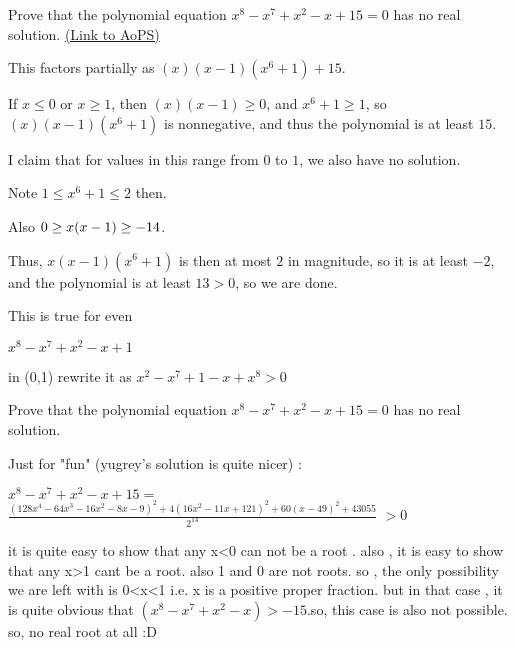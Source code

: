 \begin{problem}
	Prove that the polynomial equation $x^{8}-x^{7}+x^{2}-x+15=0$ has no real solution.
	\flushright \href{https://artofproblemsolving.com/community/c6h479486}{(Link to AoPS)}
\end{problem}



\begin{solution}
	This factors partially as $(x)(x-1)(x^6+1)+15$.

If $x\le 0$ or $x\ge 1$, then $(x)(x-1)\ge 0$, and $x^6+1\ge 1$, so $(x)(x-1)(x^6+1)$ is nonnegative, and thus the polynomial is at least $15$.

I claim that for values in this range from $0$ to $1$, we also have no solution.

Note $1\le x^6+1\le 2$ then.

Also $0\ge x(x-1)\ge -1\/4$.

Thus, $x(x-1)(x^6+1)$ is then at most $2$ in magnitude, so it is at least $-2$, and the polynomial is at least $13>0$, so we are done.
\end{solution}



\begin{solution}
	This is true for even

$x^8 - x^7 + x^2 - x + 1$

in (0,1) rewrite it as $x^2 - x^7 + 1- x + x^8 > 0$
\end{solution}



\begin{solution}
	\begin{tcolorbox}Prove that the polynomial equation $x^{8}-x^{7}+x^{2}-x+15=0$ has no real solution.\end{tcolorbox}
Just for "fun" (yugrey's solution is quite nicer) :

$x^8-x^7+x^2-x+15=$ $\frac{(128x^4-64x^3-16x^2-8x-9)^2+4(16x^2-11x+121)^2+60(x-49)^2+43055}{2^{14}}$ $>0$
\end{solution}



\begin{solution}
	it is quite easy to show that any x<0 can not be a root . also , it is easy to show that any x>1 cant be a root.
also 1 and 0 are not roots. so , the only possibility we are left with is 0<x<1 i.e. x is a positive proper fraction.
but in that case , it is quite obvious that $(x^8-x^7+x^2-x)>-15$.so, this case is also not possible. so, no real root at all :D
\end{solution}



